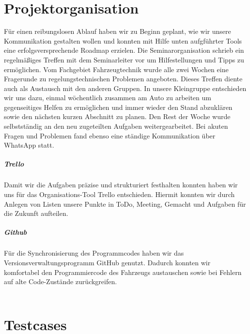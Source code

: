 \section{Projektorganisation}
    F\"ur einen reibungslosen Ablauf haben wir zu Beginn geplant, wie wir unsere Kommunikation gestalten wollen und konnten mit Hilfe unten aufgf\"uhrter Tools eine erfolgsversprechende Roadmap erzielen.
    Die Seminarorganisation schrieb ein regelm\"a\ss{}iges Treffen mit dem Seminarleiter vor um Hilfestellungen und Tipps zu erm\"oglichen. Vom Fachgebiet Fahrzeugtechnik wurde alle zwei Wochen eine Fragerunde zu regelungstechnischen Problemen angeboten. Dieses Treffen diente auch als Austausch mit den anderen Gruppen.
    In unsere Kleingruppe entschieden wir uns dazu, einmal w\"ochentlich zusammen am Auto zu arbeiten um gegenseitiges Helfen zu erm\"oglichen und immer wieder den Stand abzukl\"aren sowie den n\"achsten kurzen Abschnitt zu planen.
    Den Rest der Woche wurde selbstst\"andig an den neu zugeteilten Aufgaben weitergearbeitet.
    Bei akuten Fragen und Problemen fand ebenso eine st\"andige Kommunikation über WhatsApp statt.
    
    \subparagraph{Trello}
    Damit wir die Aufgaben pr\"azise und strukturiert festhalten konnten haben wir uns f\"ur das Organisations-Tool Trello entschieden. Hiermit konnten wir durch Anlegen von Listen unsere Punkte in \glqq ToDo\grqq, \glqq Meeting\grqq, \glqq Gemacht\grqq{} und \glqq Aufgaben f\"ur die Zukunft\grqq{} aufteilen.
    
    \subparagraph{Github}
    F\"ur die Synchronisierung des Programmcodes haben wir das Versionsverwaltungsprogramm GitHub genutzt. Dadurch konnten wir komfortabel den Programmiercode des Fahrzeugs austauschen sowie bei Fehlern auf alte Code-Zust\"ande zur\"uckgreifen.
    \\ \\

\section{Testcases}

